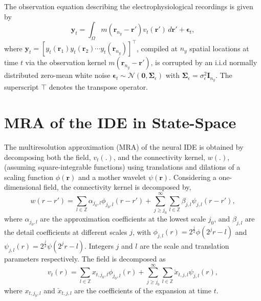 \documentclass[journal,a4paper]{IEEEtran}
\begin{document}
The observation equation describing the electrophysiological recordings is given by 
\begin{equation}\label{eq:ObservationEquation}
	\mathbf y_t = \int_{\Omega} { m\left(\mathbf{r}_{n_y}-\mathbf{r}'\right) v_t\left(\mathbf{r}'\right) \, d\mathbf{r}'} + \boldsymbol\epsilon_t, 
\end{equation}
where $\mathbf{y}_{t} = [y_t(\mathbf{r}_1) y_t(\mathbf{r}_2) \cdots y_t(\mathbf{r}_{n_y})]^\top$, compiled at $n_{y}$ spatial locations at time $t$ via the observation kernel $m\left(\mathbf{r}_{n_y}-\mathbf{r}'\right)$, is corrupted by an i.i.d normally distributed zero-mean white noise $\boldsymbol{\epsilon}_{t}\sim \mathcal{N}\left(\mathbf{0},\mathbf{\Sigma}_{\epsilon}\right)$ with $\mathbf{\Sigma}_{\epsilon}=\sigma_{\epsilon}^2\mathbf I_{n_y} $. The superscript $\top$ denotes the transpose operator.

\section{MRA of the IDE in State-Space}
The multiresolution approximation (MRA) of the neural IDE is obtained by decomposing both the field, $v_t(.)$, and the connectivity kernel, $w(.)$, (assuming square-integrable functions) using translations and dilations of a scaling function $\phi(\mathbf{r})$ and a mother wavelet $\psi(\mathbf{r})$. Considering a one-dimensional field, the connectivity kernel is decomposed by,
\begin{equation}
 w\left(r-r'\right)=\sum_{l \in \mathbb{Z}}\alpha_{j_0,l}\phi_{j_0,l}\left(r-r'\right)+\sum_{j\geq j_0}^{\infty} \sum_{l \in \mathbb{Z}}\beta_{j,l}\psi_{j,l}\left(r-r'\right), 
\label{eq:KernelExpansion}
\end{equation}
where $\alpha_{j_0,l}$ are the approximation coefficients at the lowest scale $j_0$, and $\beta_{j,l}$ are the detail coefficients at different scales $j$, with $\phi_{j,l}\left(r\right)=2^{\frac{j}{2}}\phi\left(2^jr-l\right) $ and $\psi_{j,l}\left(r\right)=2^{\frac{j}{2}}\psi\left(2^jr-l\right)$. Integers $j$ and $l$ are the scale and translation parameters respectively. The field is decomposed as
\begin{equation}
 v_t\left(r\right)=\sum_{l \in \mathbb{Z}}x_{t,j_{0},l}\phi_{j_{0},l}\left(r\right)+\sum_{j\geq j_0}^{\infty} \sum_{l \in \mathbb{Z}} \check{x}_{t,j,l}\psi_{j,l}\left(r\right),
\label{eq:FieldExpansion}
\end{equation}
where $ x_{t,j_{0},l}$ and $\check{x}_{t,j,l} $ are the coefficients of the expansion at time $t$.
\end{document}
